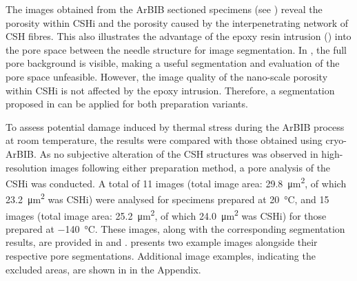 The images obtained from the \ac{ArBIB} sectioned specimens (see ) reveal the porosity within \ac{CSHi} and the porosity caused by the interpenetrating network of \ac{CSH} fibres.
This also illustrates the advantage of the epoxy resin intrusion () into the pore space between the needle structure for image segmentation.
In , the full pore background is visible, making a useful segmentation and evaluation of the pore space unfeasible.
However, the image quality of the nano-scale porosity within \ac{CSHi} is not affected by the epoxy intrusion.
Therefore, a segmentation proposed in  can be applied for both preparation variants.

To assess potential damage induced by thermal stress during the \ac{ArBIB} process at room temperature, the results were compared with those obtained using cryo-\ac{ArBIB}.
As no subjective alteration of the \ac{CSH} structures was observed in high-resolution images following either preparation method, a pore analysis of the \ac{CSHi} was conducted.
A total of \num{11} images (total image area: \qty{29.8}{\micro\meter\squared}, of which \qty{23.2}{\micro\meter\squared} was \ac{CSHi}) were analysed for specimens prepared at \qty{20}{\celsius}, and \num{15} images (total image area: \qty{25.2}{\micro\meter\squared}, of which \qty{24.0}{\micro\meter\squared} was \ac{CSHi}) for those prepared at \qty{-140}{\celsius}.
These images, along with the corresponding segmentation results, are provided in  and \cite{kleiner.2021g,kleiner.2021h}.
 presents two example images alongside their respective pore segmentations.
Additional image examples, indicating the excluded areas, are shown in  in the Appendix.

